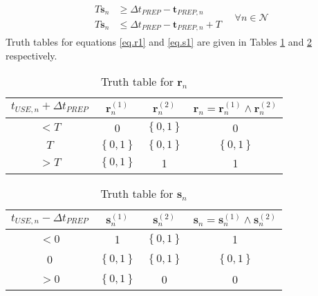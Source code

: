 \begin{equation}
    \begin{split}
        \begin{alignedat}{2}
            T \boldsymbol{s}_{n} &\ge \Delta t_{\mathit{PREP}}
            - \boldsymbol{t}_{\mathit{PREP},n}\\
            T \boldsymbol{s}_{n} &\le \Delta t_{\mathit{PREP}} 
            -\boldsymbol{t}_{\mathit{PREP},n} + T
        \end{alignedat}
        \quad \forall n \in \mathcal{N}
    \end{split}
    \label{eq.s1}
\end{equation}
Truth tables for equations \ref{eq.r1} and \ref{eq.s1} are given in Tables
\ref{tbl.truthr} and \ref{tbl.truths} respectively.
\begin{table}[h!]
    \centering
    \caption{Truth table for $\boldsymbol{r}_{n}$}
    \label{tbl.truthr}
    \begin{tabular}{c | c c | c}
        $t_{\mathit{USE},n} + \Delta t_{\mathit{PREP}}$
        & $\boldsymbol{r}_{n}^{\left( 1 \right)}$
        & $\boldsymbol{r}_{n}^{\left( 2 \right)}$
        & $\boldsymbol{r}_{n} = \boldsymbol{r}_{n}^{\left( 1 \right)} \land
        \boldsymbol{r}_{n}^{\left( 2 \right)}$\\ \hline
        $< T$ & 0 & $\left\{ 0,1 \right\}$ & 0\\
        $T$ & $\left\{ 0,1 \right\}$ & $\left\{ 0,1 \right\}$
            & $\left\{ 0,1 \right\}$\\
        $>T$ & $\left\{ 0,1 \right\}$ & 1 & 1\\
    \end{tabular}
\end{table}
\begin{table}[h!]
    \centering
    \caption{Truth table for $\boldsymbol{s}_{n}$}
    \label{tbl.truths}
    \begin{tabular}{c | c c | c}
        $t_{\mathit{USE},n} - \Delta t_{\mathit{PREP}}$
        & $\boldsymbol{s}_{n}^{\left( 1 \right)}$
        & $\boldsymbol{s}_{n}^{\left( 2 \right)}$
        & $\boldsymbol{s}_{n} = \boldsymbol{s}_{n}^{\left( 1 \right)} \land
        \boldsymbol{s}_{n}^{\left( 2 \right)}$\\ \hline
        $< 0$ & 1 & $\left\{ 0,1 \right\}$ & 1\\
        0 & $\left\{ 0,1 \right\}$ & $\left\{ 0,1 \right\}$
            & $\left\{ 0,1 \right\}$\\
        $> 0$ & $\left\{ 0,1 \right\}$ & 0 & 0\\
    \end{tabular}
\end{table}

